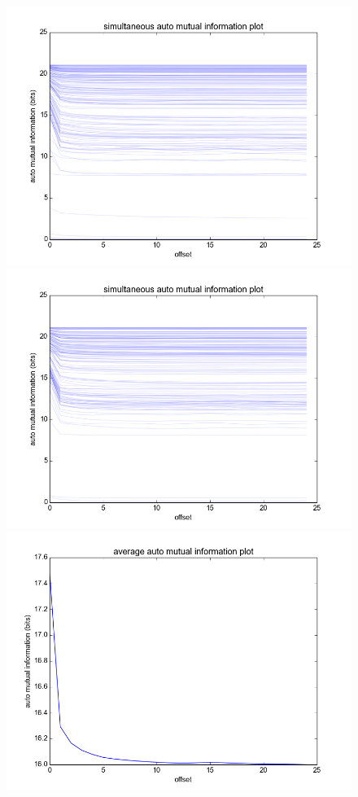 \documentclass[12pt]{article}
\begin{document}
\begin{figure}
  \centering
  \includegraphics[scale=0.4]{wests_ami_mc}
  \includegraphics[scale=0.4]{norths_ami_mc}
  \includegraphics[scale=0.4]{wests_ami_summary}

\end{figure}
\end{document}
